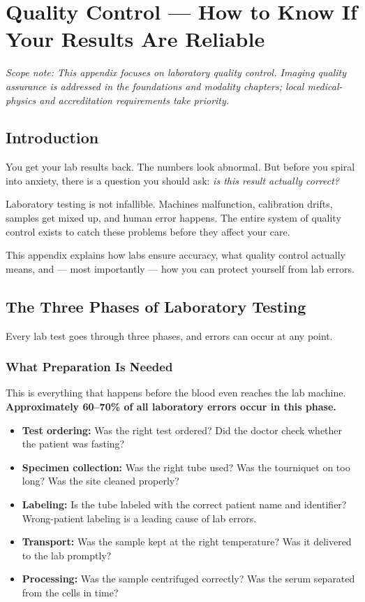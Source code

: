 \chapter{Quality Control --- How to Know If Your Results Are Reliable}
\label{app:quality_control}

\textit{Scope note: This appendix focuses on laboratory quality control. Imaging quality assurance is addressed in the foundations and modality chapters; local medical-physics and accreditation requirements take priority.}

\clearpage
\section{Introduction}

You get your lab results back. The numbers look abnormal. But before you spiral into anxiety, there is a question you should ask: \emph{is this result actually correct?}

Laboratory testing is not infallible. Machines malfunction, calibration drifts, samples get mixed up, and human error happens. The entire system of quality control exists to catch these problems before they affect your care.

This appendix explains how labs ensure accuracy, what quality control actually means, and --- most importantly --- how you can protect yourself from lab errors.

\clearpage
\section{The Three Phases of Laboratory Testing}

Every lab test goes through three phases, and errors can occur at any point.

\subsection{What Preparation Is Needed}

This is everything that happens before the blood even reaches the lab machine. \textbf{Approximately 60--70\% of all laboratory errors occur in this phase.}

\begin{itemize}
    \item \textbf{Test ordering:} Was the right test ordered? Did the doctor check whether the patient was fasting?
    \item \textbf{Specimen collection:} Was the right tube used? Was the tourniquet on too long? Was the site cleaned properly?
    \item \textbf{Labeling:} Is the tube labeled with the correct patient name and identifier? Wrong-patient labeling is a leading cause of lab errors.
    \item \textbf{Transport:} Was the sample kept at the right temperature? Was it delivered to the lab promptly?
    \item \textbf{Processing:} Was the sample centrifuged correctly? Was the serum separated from the cells in time?
\end{itemize}

